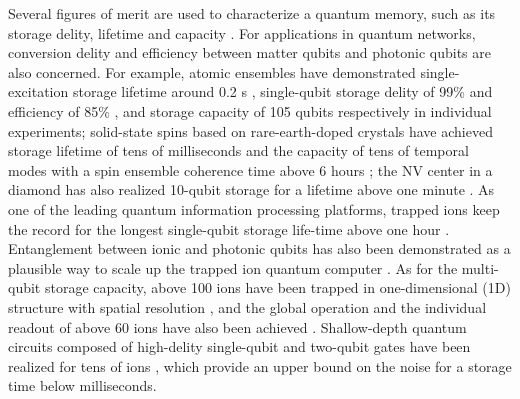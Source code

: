 Several figures of merit are used to characterize a quantum memory, such as its storage delity, lifetime and capacity \cite{lvovsky2009optical}. For applications in quantum networks, conversion delity and efficiency between matter qubits and photonic qubits are also concerned. For example, atomic ensembles have demonstrated single-excitation storage lifetime around 0.2 s \cite{yang2016efficient}, single-qubit storage delity of 99\% and efficiency of 85\% \cite{wang2019efficient}, and storage capacity of 105 qubits respectively in individual experiments; solid-state spins based on rare-earth-doped crystals have achieved storage lifetime of tens of milliseconds \cite{ortu2022storage} and the capacity of tens of temporal modes \cite{lago2021telecom} with a spin ensemble coherence time above 6 hours \cite{zhong2015optically}; the NV center in a diamond has also realized 10-qubit storage for a lifetime above one minute \cite{bradley2019ten}. As one of the leading quantum information processing platforms, trapped ions keep the record for the longest single-qubit storage life-time above one hour \cite{wang2021single}. Entanglement between ionic and photonic qubits has also been demonstrated \cite{blinov2004observation,stute2012tunable,hucul2015modular,bock2018high,krutyanskiy2019light} as a plausible way to scale up the trapped ion quantum computer \cite{duan2010colloquium,hucul2015modular}. As for the multi-qubit storage capacity, above 100 ions have been trapped in one-dimensional (1D) structure with spatial resolution \cite{pagano2018cryogenic}, and the global operation and the individual readout of above 60 ions have also been achieved \cite{li2023probing}. Shallow-depth quantum circuits composed of high-delity single-qubit and two-qubit gates have been realized for tens of ions \cite{egan2021fault,postler2022demonstration}, which provide an upper bound on the noise for a storage time below milliseconds.

